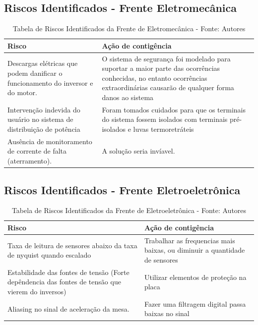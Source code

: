 \subsection*{Riscos Identificados - Frente Eletromecânica}

\begin{table}[H]
    \begin{tabular}{|p{7cm}|p{7cm}|}
        \hline
        \textbf{Risco} & \textbf{Ação de contigência} \\ \hline
        Descargas elétricas que podem danificar o funcionamento do inversor e do motor. & O sistema de segurança foi modelado para suportar a maior parte das ocorrências conhecidas, no entanto ocorrências extraordinárias causarão de qualquer forma danos ao sistema \\ \hline
        Intervenção indevida do usuário no sistema de distribuição de potência & Foram tomados cuidados para que os terminais do sistema fossem isolados com terminais pré-isolados e luvas termoretráteis \\ \hline
        Ausência de monitoramento de corrente de falta (aterramento). & A solução seria invíavel. \\ \hline
    \end{tabular}
    \caption{Tabela de Riscos Identificados da Frente de Eletromecânica - Fonte: Autores}
    \label{tab:tabela_riscos_eletromecanica}
\end{table}

\subsection*{Riscos Identificados - Frente Eletroeletrônica}

\begin{table}[H]
    \begin{tabular}{|p{7cm}|p{7cm}|}
        \hline
        \textbf{Risco} & \textbf{Ação de contigência} \\ \hline
        Taxa de leitura de sensores abaixo da taxa de nyquist quando escalado & Trabalhar as frequencias mais baixas, ou diminuir a quantidade de sensores \\ \hline
        Estabilidade das fontes de tensão (Forte depêndencia das fontes de tensão que vierem do inversos) & Utilizar elementos de proteção na placa \\ \hline
        Aliasing no sinal de aceleração da mesa. & Fazer uma filtragem digital passa baixas no sinal \\ \hline
    \end{tabular}
    \caption{Tabela de Riscos Identificados da Frente de Eletroeletrônica - Fonte: Autores}
    \label{tab:tabela_riscos_eletroeletronica}
\end{table}

